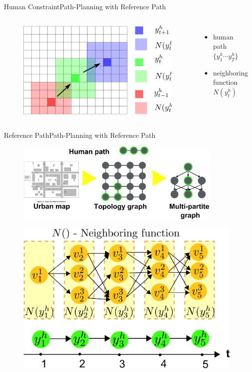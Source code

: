 \begin{frame}{Human Constraint}{Path-Planning with Reference Path}
\begin{columns}
\begin{figure}
	\centering
	\includegraphics[width = \textwidth]{./figure/humanConstraint}
\end{figure}
\begin{itemize}
	\item { human path $ \{ y^{h}_{1} \cdots y^{h}_{T} \} $ }
	\item { neighboring function $ N( y^{h}_{t} ) $ }
\end{itemize}

\end{columns}

\end{frame}

\begin{frame}{Reference Path}{Path-Planning with Reference Path}

\begin{figure}
\centering
\includegraphics[width = 0.9\textwidth]{./figure/layers}
\end{figure}

\begin{figure}
	\centering
	\includegraphics[width = .5\textwidth]{./figure/MultiPartite}
\end{figure}

\end{frame}

